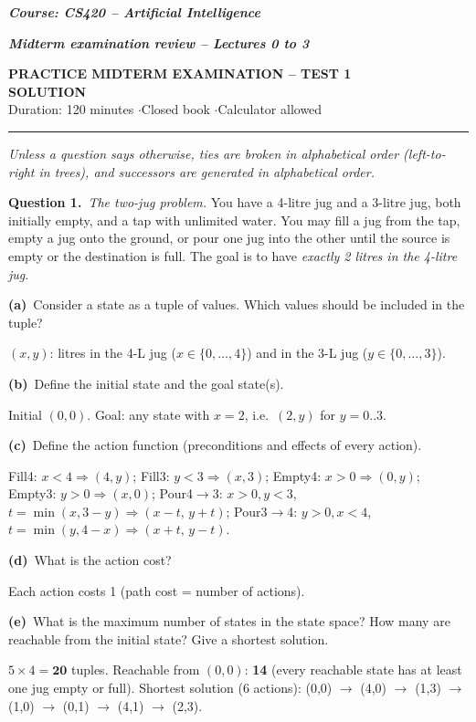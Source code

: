 \documentclass[11pt,a4paper]{article}
\newcommand{\question}[1]{\par\medskip\noindent\textbf{Question #1.}\ }
\newcommand{\subq}[1]{\par\smallskip\noindent\textbf{#1}\ }
\begin{document}
{\large\textbf{\textit{Course: CS420 -- Artificial Intelligence}}}\par
{\textbf{\textit{Midterm examination review -- Lectures 0 to 3}}}\par
\begin{center}{\Large\bfseries PRACTICE MIDTERM EXAMINATION -- TEST 1\\[2pt]\textcolor{blue!55!black}{SOLUTION}}\\[3pt]
{\small Duration: 120 minutes \quad$\cdot$\quad Closed book \quad$\cdot$\quad Calculator allowed}\end{center}
\noindent\rule{\linewidth}{0.6pt}

{\small\textit{Unless a question says otherwise, ties are broken in alphabetical order (left-to-right in trees), and successors are generated in alphabetical order.}}\par
\question{1}\textit{The two-jug problem.} You have a 4-litre jug and a 3-litre jug, both initially empty, and a tap with unlimited water. You may fill a jug from the tap, empty a jug onto the ground, or pour one jug into the other until the source is empty or the destination is full. The goal is to have \emph{exactly 2 litres in the 4-litre jug}.
\subq{(a)}Consider a state as a tuple of values. Which values should be included in the tuple?
\begin{solbox}
$(x, y)$: litres in the 4-L jug ($x\in\{0,\dots,4\}$) and in the 3-L jug ($y\in\{0,\dots,3\}$).
\end{solbox}
\subq{(b)}Define the initial state and the goal state(s).
\begin{solbox}
Initial $(0,0)$. Goal: any state with $x=2$, i.e.\ $(2,y)$ for $y=0..3$.
\end{solbox}
\subq{(c)}Define the action function (preconditions and effects of every action).
\begin{solbox}
Fill4: $x<4 \Rightarrow (4,y)$; Fill3: $y<3\Rightarrow(x,3)$; Empty4: $x>0\Rightarrow(0,y)$; Empty3: $y>0\Rightarrow(x,0)$; Pour4$\to$3: $x>0, y<3$, $t=\min(x,3-y)\Rightarrow(x-t,\,y+t)$; Pour3$\to$4: $y>0,x<4$, $t=\min(y,4-x)\Rightarrow(x+t,\,y-t)$.
\end{solbox}
\subq{(d)}What is the action cost?
\begin{solbox}
Each action costs 1 (path cost = number of actions).
\end{solbox}
\subq{(e)}What is the maximum number of states in the state space? How many are reachable from the initial state? Give a shortest solution.
\begin{solbox}
$5\times4=\mathbf{20}$ tuples. Reachable from $(0,0)$: \textbf{14} (every reachable state has at least one jug empty or full). Shortest solution (6 actions): (0,0) $\to$ (4,0) $\to$ (1,3) $\to$ (1,0) $\to$ (0,1) $\to$ (4,1) $\to$ (2,3).
\end{solbox}
\end{document}
